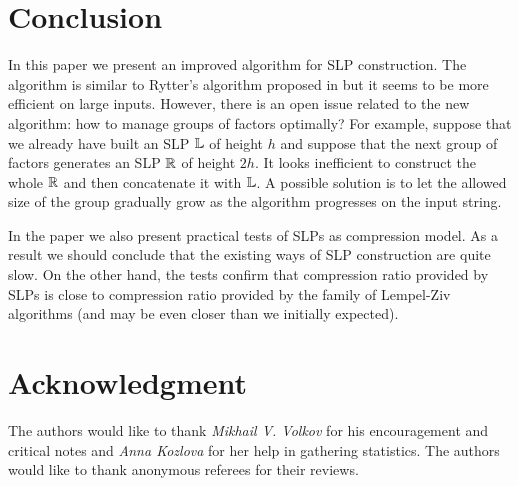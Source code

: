 ﻿\documentclass[10pt, conference, compsocconf]{IEEEtran}
\begin{document}
\section{Conclusion}

In this paper we present an improved algorithm for SLP construction. The
algorithm is similar to Rytter's algorithm proposed in \cite{SLPConstruction}
but it seems to be more efficient on large inputs. However, there is an open
issue related to the new algorithm: how to manage groups of factors optimally?
For example, suppose that we already have built an SLP $\mathbb{L}$ of height $h$
and suppose that the next group of factors generates an SLP $\mathbb{R}$ of height
$2h$. It looks inefficient to construct the whole $\mathbb{R}$ and then
concatenate it with $\mathbb{L}$. A possible solution is to let the allowed size
of the group gradually grow as the algorithm progresses on the input string.

In the paper we also present practical tests of SLPs as compression model. As a
result we should conclude that the existing ways of SLP construction are quite
slow. On the other hand, the tests confirm that compression ratio provided by
SLPs is close to compression ratio provided by the family of Lempel-Ziv
algorithms (and may be even closer than we initially expected).

\RandomCompression

\section*{Acknowledgment}

The authors would like to thank \emph{Mikhail V. Volkov} for his encouragement
and critical notes and \emph{Anna Kozlova} for her help in gathering
statistics. The authors would like to thank anonymous referees for their reviews.
\end{document}
